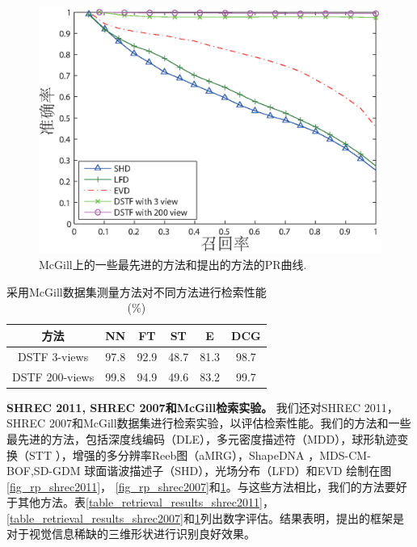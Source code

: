 \begin{figure}[tbhp]
\begin{center}
\includegraphics[width=1.0\linewidth]{figures/all_rp_cl_McGill.eps}
\end{center} 
\vspace{-4mm}
\caption{McGill上的一些最先进的方法和提出的方法的PR曲线.} \label{fig_rp_McGill}
\end{figure}

\begin{table}[tbhp]

\caption{采用McGill数据集测量方法对不同方法进行检索性能(\%)}\label{table_retrieval_results_McGill}
\begin{center}
\begin{tabular}{cccccc}  %
\hline  \hline
方法                 &NN &FT &ST &E &DCG\\ 
\hline     
DSTF 3-views					&97.8 &92.9 &48.7 	&81.3		&98.7 \\
DSTF 200-views				&99.8 &	94.9 &49.6	&83.2		&99.7	\\
\hline  \hline      %
\end{tabular}
\end{center} 
\end{table}








\textbf{SHREC 2011, SHREC 2007和McGill检索实验。} 我们还对SHREC 2011，SHREC 2007和McGill数据集进行检索实验，以评估检索性能。我们的方法和一些最先进的方法，包括深度线编码（DLE）\cite {giorgi2007watertight}，多元密度描述符（MDD）\cite {giorgi2007watertight}，球形轨迹变换（STT ）\cite {giorgi2007watertight}，增强的多分辨率Reeb图（aMRG）\cite {giorgi2007watertight}，ShapeDNA \cite {Reuter2006Laplace}，MDS-CM-BOF\cite{lian2010non},SD-GDM \cite{Lian2011SHREC} 球面谐波描述子（SHD）\cite{Kazhdan2003Rotation}，光场分布（LFD）\cite{chen2003visual}和EVD \cite {gal2006salient}绘制在图\ref {fig_rp_shrec2011}， \ref {fig_rp_shrec2007}和\ref {fig_rp_McGill}。与这些方法相比，我们的方法要好于其他方法。表\ref {table_retrieval_results_shrec2011}，\ref {table_retrieval_results_shrec2007}和\ref {table_retrieval_results_McGill}列出数字评估。结果表明，提出的框架是对于视觉信息稀缺的三维形状进行识别良好效果。


